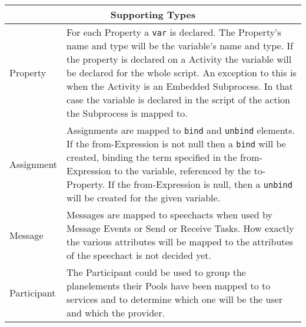\begin{longtable}{|p{3.5cm}|p{10.5cm}|}
\hline
\multicolumn{2}{|c|}{\textbf{Supporting Types}}
\\\hline
Property                & For each Property a \verb|var| is declared. The Property's name and type will be the variable's name and type. If the property is declared on a Activity the variable will be declared for the whole script. An exception to this is when the Activity is an Embedded Subprocess. In that case the variable is declared in the script of the action the Subprocess is mapped to.
\\\hline
Assignment              & Assignments are mapped to \verb|bind| and \verb|unbind| elements. If the from-Expression is not null then a \verb|bind| will be created, binding the term specified in the from-Expression to the variable, referenced by the to-Property. If the from-Expression is null, then a \verb|unbind| will be created for the given variable.
\\\hline
Message                 & Messages are mapped to speechacts when used by Message Events or Send or Receive Tasks. How exactly the various attributes will be mapped to the attributes of the speechact is not decided yet.
\\\hline
Participant             & The Participant could be used to group the planelements their Pools have been mapped to to services and to determine which one will be the user and which the provider.
\\\hline
\end{longtable}



